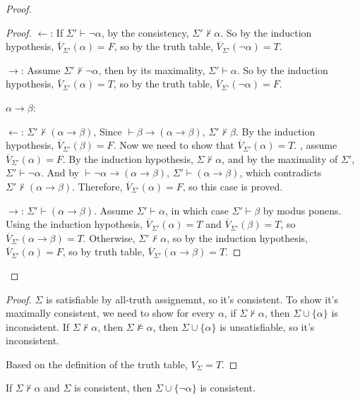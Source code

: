 \begin{proof}
\begin{proof}
$\leftarrow$:
If $\Sigma'\vdash\neg\alpha$, by the consistency, $\Sigma'\nvdash\alpha$. So by the induction hypothesis, $\overline{V}_{\Sigma'}(\alpha)=F$, so by the truth table, $\overline{V}_{\Sigma'}(\neg\alpha)=T$.

$\rightarrow$:
Assume $\Sigma'\nvdash\neg\alpha$, then by its maximality, $\Sigma'\vdash\alpha$. So by the induction hypothesis, $\overline{V}_{\Sigma'}(\alpha)=T$, so by the truth table, $\overline{V}_{\Sigma'}(\neg\alpha)=F$.

$\alpha\rightarrow\beta$:

$\leftarrow$: $\Sigma'\nvdash(\alpha\rightarrow\beta)$,
Since $\vdash\beta\rightarrow(\alpha\rightarrow\beta)$, $\Sigma'\nvdash\beta$. 
By the induction hypothesis, $\overline{V}_{\Sigma'}(\beta)=F$.
Now we need to show that $\overline{V}_{\Sigma'}(\alpha)=T$. 
\bwoc, assume $\overline{V}_{\Sigma'}(\alpha)=F$.
By the induction hypothesis, $\Sigma\nvdash\alpha$, and by the maximality of $\Sigma'$, $\Sigma'\vdash\neg\alpha$. And by $\vdash\neg\alpha\rightarrow(\alpha\rightarrow\beta)$, $\Sigma'\vdash(\alpha\rightarrow\beta)$, which contradicts $\Sigma'\nvdash(\alpha\rightarrow\beta)$. Therefore, $\overline{V}_{\Sigma'}(\alpha)=F$, so this case is proved.

$\rightarrow$: $\Sigma'\vdash(\alpha\rightarrow\beta)$.
Assume $\Sigma'\vdash\alpha$, in which case $\Sigma'\vdash\beta$ by modus ponens. Using the induction hypothesis, $\overline{V}_{\Sigma'}(\alpha)=T$ and $\overline{V}_{\Sigma'}(\beta)=T$, so $\overline{V}_{\Sigma'}(\alpha\rightarrow\beta)=T$.
Otherwise, $\Sigma'\nvdash\alpha$, so by the induction hypothesis, $\overline{V}_{\Sigma'}(\alpha)=F$, so by truth table, $\overline{V}_{\Sigma'}(\alpha\rightarrow\beta)=T$.
\end{proof}
\end{proof}


\begin{proof}
$\Sigma$ is satisfiable by all-truth assignemnt, so it's consistent.
To show it's maximally consistent, we need to show for every $\alpha$, if $\Sigma\nvdash\alpha$, then $\Sigma\cup\{\alpha\}$ is inconsistent.
If $\Sigma\nvdash\alpha$, then $\Sigma\nvDash\alpha$, then $\Sigma\cup\{\alpha\}$ is unsatisfiable, so it's inconsistent.

Based on the definition of the truth table, $V_{\Sigma}=T$.
\end{proof}

\begin{lemma}
If $\Sigma\nvdash\alpha$ and $\Sigma$ is consistent, then $\Sigma\cup\{\neg\alpha\}$ is consistent.
\end{lemma}


